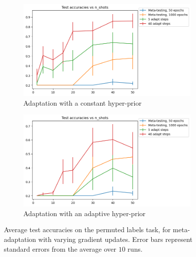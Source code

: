 \documentclass[letterpaper]{article} %
\theoremstyle{definition}
\begin{document}
\begin{figure}[ht!]
	\centering
	\begin{subfigure}[b]{0.4\textwidth}
		\centering
		\includegraphics[width=\textwidth]{test_accuracies_labels_const}
		\caption{Adaptation with a constant hyper-prior}
	\end{subfigure}
	\hfill
	\begin{subfigure}[b]{0.4\textwidth}
		\centering
		\includegraphics[width=\textwidth]{test_accuracies_labels_var}
		\caption{Adaptation with an adaptive hyper-prior}	 	
	\end{subfigure}
	\hfill
	\caption{Average test accuracies on the permuted labels task, for meta-adaptation with varying gradient updates. Error bars represent standard errors from the average over $10$ runs.}	 
	\label{fig:results-labels}
\end{figure}
\end{document}
